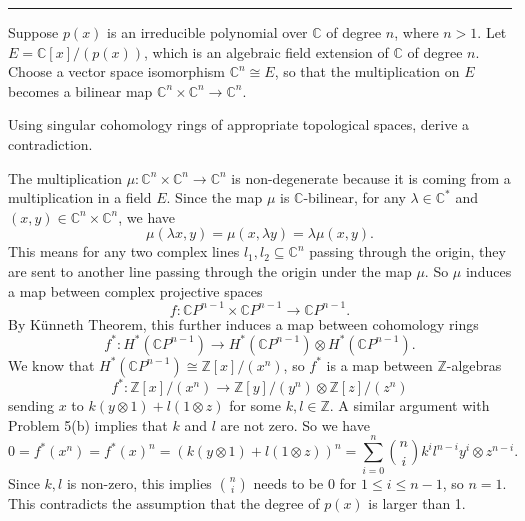 \documentclass[letterpaper, 12pt]{article}
\begin{document}
\noindent\rule{7in}{2.8pt}
\begin{problem}{6}
Suppose \(p(x)\) is an irreducible polynomial over \(\mathbb{C}\) of degree \(n\), where \(n>1\). Let \(E=\mathbb{C}[x]/(p(x))\), which is an algebraic field extension of \(\mathbb{C}\) of degree \(n\). Choose a vector space isomorphism \(\mathbb{C}^n\cong E\), so that the multiplication on \(E\) becomes a bilinear map \(\mathbb{C}^n\times \mathbb{C}^n\rightarrow \mathbb{C}^n\).

Using singular cohomology rings of appropriate topological spaces, derive a contradiction. 
\end{problem}
\begin{solution}
The multiplication \(\mu:\mathbb{C}^n\times \mathbb{C}^n\rightarrow \mathbb{C}^n\) is non-degenerate because it is coming from a multiplication in a field \(E\). Since the map \(\mu\) is \(\mathbb{C}\)-bilinear, for any \(\lambda\in \mathbb{C}^*\) and \((x,y)\in \mathbb{C}^n\times \mathbb{C}^n\), we have 
\[\mu(\lambda x,y)=\mu(x,\lambda y)=\lambda \mu(x,y).\]
This means for any two complex lines \(l_1,l_2\subseteq \mathbb{C}^n\) passing through the origin, they are sent to another line passing through the origin under the map \(\mu\). So \(\mu\) induces a map between complex projective spaces 
\[f:\mathbb{C}P^{n-1}\times \mathbb{C}P^{n-1}\rightarrow \mathbb{C}P^{n-1}.\]
By Künneth Theorem, this further induces a map between cohomology rings 
\[f^*:H^*(\mathbb{C}P^{n-1})\rightarrow H^*(\mathbb{C}P^{n-1})\otimes H^*(\mathbb{C}P^{n-1}).\]
We know that \(H^*(\mathbb{C}P^{n-1})\cong \mathbb{Z}[x]/(x^n)\), so \(f^*\) is a map between \(\mathbb{Z}\)-algebras 
\[f^*:\mathbb{Z}[x]/(x^n)\rightarrow \mathbb{Z}[y]/(y^n)\otimes \mathbb{Z}[z]/(z^n)\]
sending \(x\) to \(k(y\otimes 1)+l(1\otimes z)\) for some \(k,l\in \mathbb{Z}\). A similar argument with Problem 5(b) implies that \(k\) and \(l\) are not zero. So we have 
\[0=f^*(x^n)=f^*(x)^n=(k(y\otimes 1)+l(1\otimes z))^n=\sum_{i=0}^{n}\binom{n}{i} k^i l^{n-i} y^i\otimes z^{n-i}.\]
Since \(k,l\) is non-zero, this implies \(n\choose i\) needs to be \(0\) for \(1\leq i\leq n-1\), so \(n=1\). This contradicts the assumption that the degree of \(p(x)\) is larger than 1. 
\end{solution}
\end{document}
